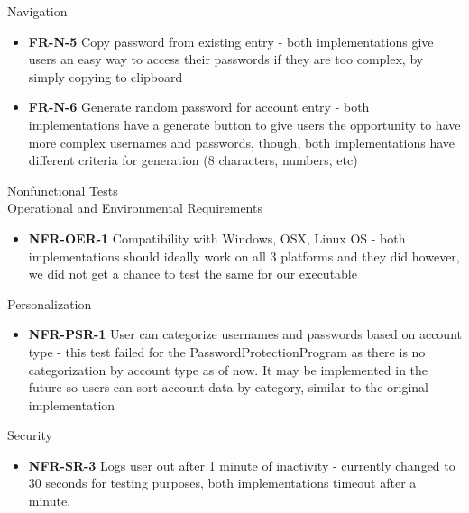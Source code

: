 \documentclass[12pt, titlepage]{article}
\begin{document}
	\quad Navigation

	\begin{itemize}

		\item \textbf{FR-N-5} Copy password from existing entry - both implementations give users an easy way to access their passwords if they are too complex, by simply copying to clipboard
		\item \textbf{FR-N-6} Generate random password for account entry - both implementations have a generate button to give users the opportunity to have more complex usernames and passwords, though, both implementations have different criteria for generation (8 characters, numbers, etc)

	\end{itemize}
	
	Nonfunctional Tests\\

	\quad Operational and Environmental Requirements

	\begin{itemize}
		
		\item \textbf{NFR-OER-1} Compatibility with Windows, OSX, Linux OS - both implementations should ideally work on all 3 platforms and they did however, we did not get a chance to test the same for our executable
	
	\end{itemize}

	\quad Personalization

	\begin{itemize}

		\item \textbf{NFR-PSR-1} User can categorize usernames and passwords based on account type - this test failed for the PasswordProtectionProgram as there is no categorization by account type as of now. It may be implemented in the future so users can sort account data by category, similar to the original implementation

	\end{itemize}

	\quad Security
	
	\begin{itemize}

		\item \textbf{NFR-SR-3} Logs user out after 1 minute of inactivity - currently changed to 30 seconds for testing purposes, both implementations timeout after a minute.

	\end{itemize}	
\end{document}
